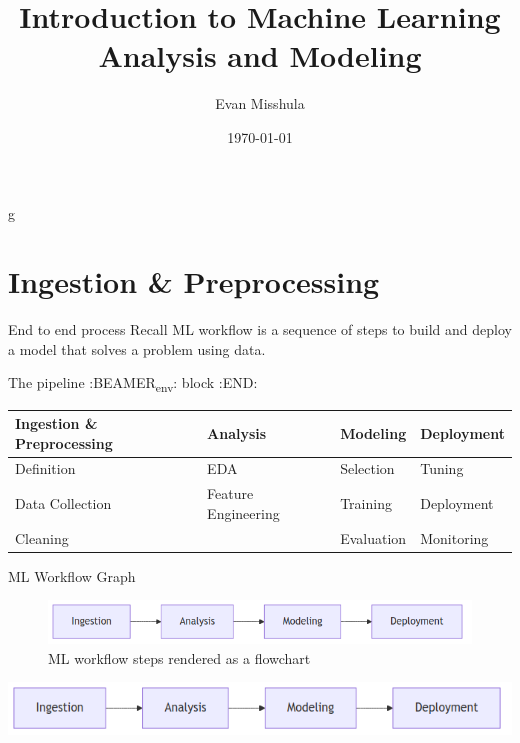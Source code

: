 \documentclass[aspectratio=169]{beamer}
\author{Evan Misshula}
\date{\today}
\title{Introduction to Machine Learning Analysis and Modeling}
\begin{document}
\maketitle
g
\section{Ingestion \& Preprocessing}
\label{sec:org0936bd6}
\begin{frame}[label={sec:org83f0076}]{End to end process}
Recall \alert{ML workflow} is a sequence of steps to build and deploy a model that
solves a problem using data.
\end{frame}

\begin{frame}[label={sec:org60b278a}]{The pipeline}
:BEAMER\textsubscript{env}: block
:END:

\begin{center}
\begin{tabular}{llll}
Ingestion \& Preprocessing & \alert{Analysis} & Modeling & Deployment\\[0pt]
\hline
Definition & \alert{EDA} & Selection & Tuning\\[0pt]
Data Collection & \alert{Feature Engineering} & Training & Deployment\\[0pt]
Cleaning &  & Evaluation & Monitoring\\[0pt]
\end{tabular}
\end{center}
\end{frame}

\begin{frame}[label={sec:org9dd809b}]{ML Workflow Graph}
\begin{figure}[htbp]
\centering
\includegraphics[width=.9\linewidth]{workflow.png}
\caption{ML workflow steps rendered as a flowchart}
\end{figure}


\begin{center}
\includegraphics[width=.9\linewidth]{workflow.png}
\end{center}
\end{frame}
\end{document}
